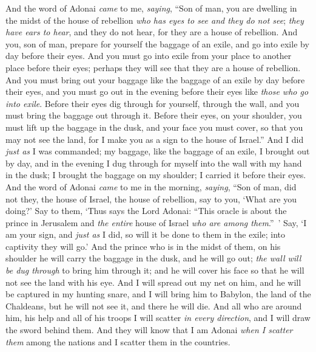 \begin{biblechapter} %
 And the word of Adonai \textit{came} to me, \textit{saying},
\verse “Son of man, you are dwelling in the midst of the house of rebellion \textit{who has eyes to see and they do not see}; \textit{they have ears to hear}, and they do not hear, for they are a house of rebellion.
\verse And you, son of man, prepare for yourself the baggage of an exile, and go into exile by day before their eyes. And you must go into exile from your place to another place before their eyes; perhaps they will see that they are a house of rebellion.
\verse And you must bring out your baggage like the baggage of an exile by day before their eyes, and you must go out in the evening before their eyes like \textit{those who go into exile}.
\verse Before their eyes dig through for yourself, through the wall, and you must bring the baggage out through it.
\verse Before their eyes, on your shoulder, you must lift up the baggage in the dusk, and your face you must cover, so that you may not see the land, for I make you as a sign to the house of Israel.”
\verse And I did \textit{just as} I was commanded; my baggage, like the baggage of an exile, I brought out by day, and in the evening I dug through for myself into the wall with my hand in the dusk; I brought the baggage on my shoulder; I carried it before their eyes.
\verse And the word of Adonai \textit{came} to me in the morning, \textit{saying},
\verse “Son of man, did not they, the house of Israel, the house of rebellion, say to you, ‘What are you doing?’
\verse Say to them, ‘Thus says the Lord Adonai: “This oracle is about the prince in Jerusalem and \textit{the entire} house of Israel \textit{who are among them}.” ’
\verse Say, ‘I am your sign, and \textit{just as} I did, so will it be done to them in the exile; into captivity they will go.’
\verse And the prince who is in the midst of them, on his shoulder he will carry the baggage in the dusk, and he will go out; \textit{the wall will be dug through} to bring him through it; and he will cover his face so that he will not see the land with his eye.
\verse And I will spread out my net on him, and he will be captured in my hunting snare, and I will bring him to Babylon, the land of the Chaldeans, but he will not see it, and there he will die.
\verse And all who are around him, his help and all of his troops I will scatter \textit{in every direction}, and I will draw the sword behind them.
\verse And they will know that I am Adonai \textit{when I scatter them} among the nations and I scatter them in the countries.

\end{biblechapter}
